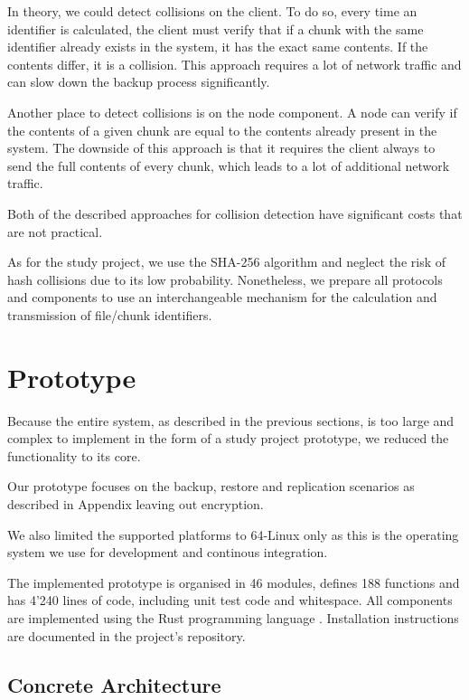 In theory, we could detect collisions on the \gls{client}. To do so, every time an identifier is calculated, the \gls{client} must verify that if a chunk with the same identifier already exists in the system, it has the exact same contents. If the contents differ, it is a collision. This approach requires a lot of network traffic and can slow down the backup process significantly.

Another place to detect collisions is on the \gls{node} component. A \gls{node} can verify if the contents of a given chunk are equal to the contents already present in the system. The downside of this approach is that it requires the \gls{client} always to send the full contents of every chunk, which leads to a lot of additional network traffic.

Both of the described approaches for collision detection have significant costs that are not practical.

As for the study project, we use the SHA-256 algorithm\cite{sha-256} and neglect the risk of hash collisions due to its low probability. Nonetheless, we prepare all protocols and components to use an interchangeable mechanism for the calculation and transmission of file/chunk identifiers.

\section{Prototype}\label{sec:prototype}

Because the entire system, as described in the previous sections, is too large and complex to implement in the form of a study project prototype, we reduced the functionality to its core.

Our prototype focuses on the backup, restore and replication scenarios as described in Appendix  leaving out encryption.

We also limited the supported platforms to 64-Linux only as this is the operating system we use for development and continous integration.

The implemented prototype is organised in 46 modules, defines 188 functions and has 4'240 lines of code, including unit test code and whitespace. All components are implemented using the Rust programming language \cite{rustlang-org}. Installation instructions are documented in the project's repository.

\subsection{Concrete Architecture}

